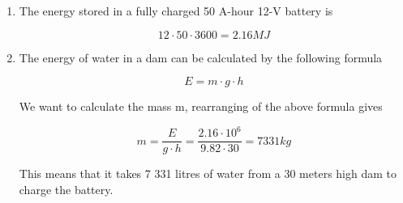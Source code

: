 \documentclass[]{article}
\begin{document}
\begin{enumerate}[label=(\alph*)]
	\item The energy stored in a fully charged 50 A-hour 12-V battery is

	\begin{equation*}
		12 \cdot 50 \cdot 3600 = 2.16 MJ
	\end{equation*}

	\item The energy of water in a dam can be calculated by the following formula
		
	\begin{equation*}
		E =  m \cdot g \cdot h
	\end{equation*}

	We want to calculate the mass m, rearranging of the above formula gives
	
	\begin{equation*}
		m = \dfrac{E}{g \cdot h} = \dfrac{2.16 \cdot 10^6}{9.82 \cdot 30} = 7331 kg
	\end{equation*}
	
	This means that it takes 7 331 litres of water from a 30 meters high dam to charge the battery. 
\end{enumerate}
	
\end{document}
